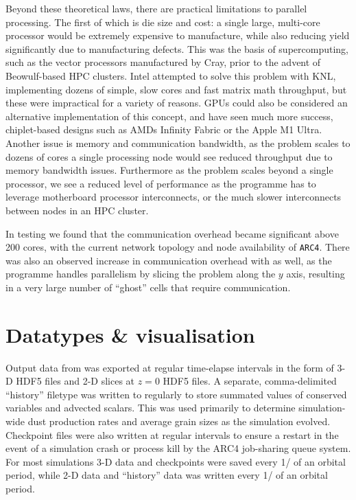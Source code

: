 Beyond these theoretical laws, there are practical limitations to parallel processing.
The first of which is die size and cost: a single large, multi-core processor would be extremely expensive to manufacture, while also reducing yield significantly due to manufacturing defects.
This was the basis of supercomputing, such as the vector processors manufactured by Cray, prior to the advent of Beowulf-based HPC clusters.
Intel attempted to solve this problem with KNL, implementing dozens of simple, slow cores and fast matrix math throughput, but these were impractical for a variety of reasons.
GPUs could also be considered an alternative implementation of this concept, and have seen much more success, chiplet-based designs such as AMDs Infinity Fabric or the Apple M1 Ultra.
Another issue is memory and communication bandwidth, as the problem scales to dozens of cores a single processing node would see reduced throughput due to memory bandwidth issues.
Furthermore as the problem scales beyond a single processor, we see a reduced level of performance as the programme has to leverage motherboard processor interconnects, or the much slower interconnects between nodes in an HPC cluster.

In testing \athena{} we found that the communication overhead became significant above 200 cores, with the current network topology and node availability of \texttt{ARC4}.
There was also an observed increase in communication overhead with \mg{} as well, as the programme handles parallelism by slicing the problem along the $y$ axis, resulting in a very large number of ``ghost'' cells that require communication.


\section{Datatypes \& visualisation}
\label{sec:visualisation}

Output data from \athena{} was exported at regular time-elapse intervals in the form of 3-D HDF5 files \parencite{hdf5} and 2-D slices at $z=0$ HDF5 files.
A separate, comma-delimited ``history'' filetype was written to regularly to store summated values of conserved variables and advected scalars.
This was used primarily to determine simulation-wide dust production rates and average grain sizes as the simulation evolved.
Checkpoint files were also written at regular intervals to ensure a restart in the event of a simulation crash or process kill by the ARC4 job-sharing queue system.
For most simulations 3-D data and checkpoints were saved every 1/ of an orbital period, while 2-D data and ``history'' data was written every 1/ of an orbital period.

